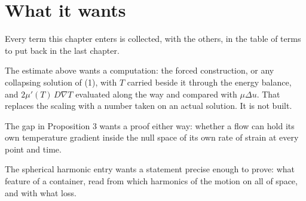 \section{What it wants}

Every term this chapter enters is collected, with the others, in the table of terms to put back
in the last chapter.

The estimate above wants a computation: the forced construction, or any collapsing solution of
(1), with $T$ carried beside it through the energy balance, and $2\mu'(T)\,D\nabla T$ evaluated
along the way and compared with $\mu\Delta u$. That replaces the scaling with a number taken on an
actual solution. It is not built.

The gap in Proposition 3 wants a proof either way: whether a flow can hold its own temperature
gradient inside the null space of its own rate of strain at every point and time.

The spherical harmonic entry wants a statement precise enough to prove: what feature of a
container, read from which harmonics of the motion on all of space, and with what loss.

